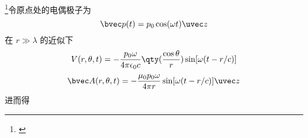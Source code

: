 
\footnote{\cite{GriffE}}令原点处的电偶极子为
\begin{equation}
\bvec p(t) = p_0 \cos(\omega t) \uvec z
\end{equation}
在 $r \gg \lambda$ 的近似下
\begin{equation}
V(r, \theta, t) = -\frac{p_0\omega}{4\pi\epsilon_0 c} \qty(\frac{\cos\theta}{r}) \sin[\omega(t - r/c)]
\end{equation}
\begin{equation}
\bvec A(r, \theta, t) = -\frac{\mu_0 p_0 \omega}{4\pi r} \sin[\omega(t - r/c)]\uvec z
\end{equation}
进而得
